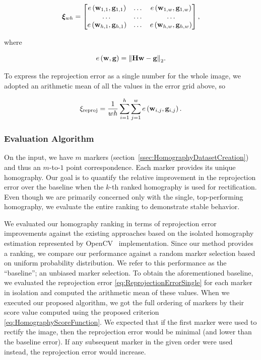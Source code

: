 \begin{equation}
    \label{eq:reprojection_error_grid}
    \boldsymbol{\xi}_{wh} =
    \begin{bmatrix}
        {e} \left( \mathbf{w}_{1, 1}, \mathbf{g}_{1, 1} \right) & \dots & {e} \left( \mathbf{w}_{1, w}, \mathbf{g}_{1, w} \right)\\
        \dots & \dots & \dots\\
        {e} \left( \mathbf{w}_{h, 1}, \mathbf{g}_{h, 1} \right) & \dots & {e} \left( \mathbf{w}_{h, w}, \mathbf{g}_{h, w} \right)
    \end{bmatrix},
\end{equation}

\noindent where

\begin{equation}
    {e} \left( \mathbf{w}, \mathbf{g} \right) = {\left\Vert {\mathbf{H}\mathbf{w}- \mathbf{g}} \right\Vert}_2.
\end{equation}

\noindent To express the reprojection error as a single number for the whole image, we adopted an arithmetic mean of all the values in the error grid above, so

\begin{equation}
    \label{eq:ReprojectionErrorSingle}
    \xi_{\text{reproj}} =
    \frac{1}{wh}
    \sum_{i = 1}^{h}
    \sum_{j = 1}^{w}
    {e} \left( \mathbf{w}_{i, j}, \mathbf{g}_{i, j} \right).
\end{equation}

\subsubsection{Evaluation Algorithm}
\label{sssec:EvaluationAlgorithm}

On the input, we have $m$ markers (section~\ref{ssec:HomographyDatasetCreation}) and thus an $m$-to-$1$ point correspondence. Each marker provides its unique homography. Our goal is to quantify the relative improvement in the reprojection error over the baseline when the $k$-th ranked homography is used for rectification. Even though we are primarily concerned only with the single, top-performing homography, we evaluate the entire ranking to demonstrate stable behavior.

We evaluated our homography ranking in terms of reprojection error improvements against the existing approaches based on the isolated homography estimation represented by OpenCV~\cite{bradski2008learning} implementation. Since our method provides a ranking, we compare our performance against a random marker selection based on uniform probability distribution. We refer to this performance as the ``baseline''; an unbiased marker selection. To obtain the aforementioned baseline, we evaluated the reprojection error \eqref{eq:ReprojectionErrorSingle} for each marker in isolation and computed the arithmetic mean of these values. When we executed our proposed algorithm, we got the full ordering of markers by their score value computed using the proposed criterion \eqref{eq:HomographyScoreFunction}. We expected that if the first marker were used to rectify the image, then the reprojection error would be minimal (and lower than the baseline error). If any subsequent marker in the given order were used instead, the reprojection error would increase.

